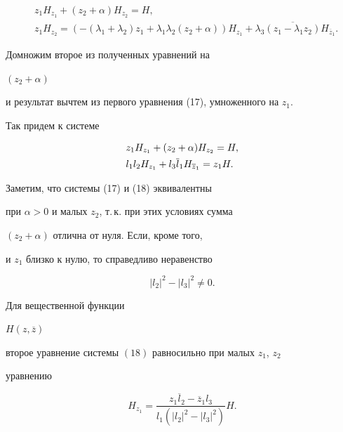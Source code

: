 \begin{equation}


\begin{split}


& z_1 H_{z_1} + ( z_2 + \alpha )  H_{z_2} = H,\\


& z_1 H_{z_2} =( - 


( \lambda_1 + \lambda_2 ) z_1 + \lambda_1 \lambda_2 ( z_2 + \alpha) ) 


 H_{z_1} +


\lambda_3 \overline {(z_1 - \lambda_1 z_2 ) } 


 H_{\overline z_1}.


\end{split}


\end{equation}





Домножим второе из полученных уравнений на 


$ (z_2 + \alpha) $


и результат вычтем из первого уравнения (17), умноженного на $ z_1 $. 


Так придем к системе


\begin{align}


& z_1 H_{z_1} + ( z_2 + \alpha )  H_{z_2} = H,\\


&l_1 l_2 H_{z_1} +l_3 \overline l_1  H_{\overline z_1} 


= z_1 H.\notag


\end{align}


Заметим, что системы (17) и (18) эквивалентны 


при $ \alpha > 0 $ и малых $ z_2 $, т.\,к. при этих условиях сумма


$ (z_2 + \alpha) $ отлична от нуля. Если, кроме того,


и $ z_1 $ близко к нулю, то справедливо неравенство


$$ 


 |l_2|^2 - |l_3|^2 \ne 0. 


$$





\begin{prop}


Для вещественной функции 


$ H(z,\overline z) $


второе уравнение системы $(18)$ равносильно при малых $ z_1$, $z_2 $ 


уравнению


\begin{equation}


 H_{z_1} =


\frac { z_1 \overline l_2 - \overline z_1 l_3 }


{ l_1 ( |l_2|^2 - |l_3|^2 ) } H.


\end{equation}


\end{prop}





